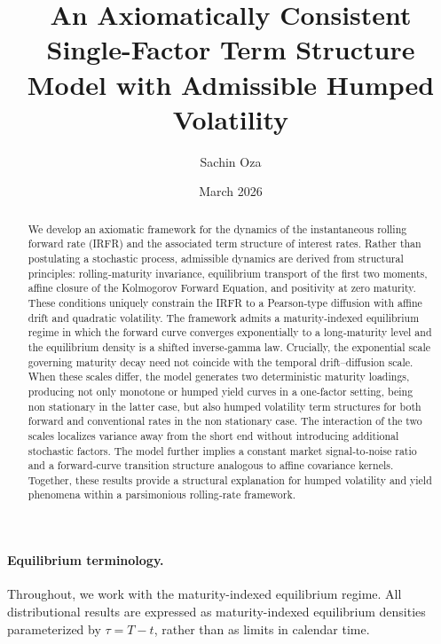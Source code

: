 \documentclass[12pt]{article}
\title{An Axiomatically Consistent Single-Factor Term Structure Model with Admissible Humped Volatility}
\author{Sachin Oza}
\date{March 2026}
\theoremstyle{statementstyle}
\begin{document}
\maketitle
\vspace{-1.0em}


\begin{abstract}
We develop an axiomatic framework for the dynamics of the instantaneous rolling forward rate (IRFR) and the associated term structure of interest rates. Rather than postulating a stochastic process, admissible dynamics are derived from structural principles: rolling‑maturity invariance, equilibrium transport of the first two moments, affine closure of the Kolmogorov Forward Equation, and positivity at zero maturity. These conditions uniquely constrain the IRFR to a Pearson‑type diffusion with affine drift and quadratic volatility.
The framework admits a maturity‑indexed equilibrium regime in which the forward curve converges exponentially to a long‑maturity level and the equilibrium density is a shifted inverse‑gamma law. Crucially, the exponential scale governing maturity decay need not coincide with the temporal drift–diffusion scale. When these scales differ, the model generates two deterministic maturity loadings, producing not only monotone or humped yield curves in a one‑factor setting, being non stationary in the latter case, but also humped volatility term structures for both forward and conventional rates in the non stationary case. The interaction of the two scales localizes variance away from the short end without introducing additional stochastic factors. The model further implies a constant market signal‑to‑noise ratio and a forward‑curve transition structure analogous to affine covariance kernels. Together, these results provide a structural explanation for humped volatility and yield phenomena within a parsimonious rolling‑rate framework.
\end{abstract}


\paragraph{Equilibrium terminology.}
Throughout, we work with the maturity-indexed equilibrium regime. All distributional results are expressed as maturity-indexed equilibrium densities parameterized by $\tau = T-t$, rather than as limits in calendar time.
\end{document}
